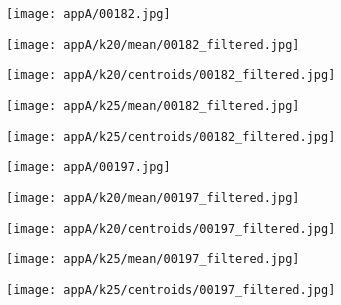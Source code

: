 \documentclass[draft,final]{vutinfth} %
\begin{document}
\begin{appendices}
\begin{figure}[h]
\centering
  \begin{subfigure}[t]{0.19\columnwidth}
    \centering
    \texttt{[image: appA/00182.jpg]}
  \end{subfigure}
  \begin{subfigure}[t]{0.19\columnwidth}
    \centering
    \texttt{[image: appA/k20/mean/00182\_filtered.jpg]}
  \end{subfigure}
  \begin{subfigure}[t]{0.19\columnwidth}
    \centering
    \texttt{[image: appA/k20/centroids/00182\_filtered.jpg]}
  \end{subfigure}
  \begin{subfigure}[t]{0.19\columnwidth}
    \centering
    \texttt{[image: appA/k25/mean/00182\_filtered.jpg]}
  \end{subfigure}
  \begin{subfigure}[t]{0.19\columnwidth}
    \centering
    \texttt{[image: appA/k25/centroids/00182\_filtered.jpg]}
  \end{subfigure}
\caption{}
\end{figure}  

\begin{figure}[h]
\centering
  \begin{subfigure}[t]{0.19\columnwidth}
    \centering
    \texttt{[image: appA/00197.jpg]}
  \end{subfigure}
  \begin{subfigure}[t]{0.19\columnwidth}
    \centering
    \texttt{[image: appA/k20/mean/00197\_filtered.jpg]}
  \end{subfigure}
  \begin{subfigure}[t]{0.19\columnwidth}
    \centering
    \texttt{[image: appA/k20/centroids/00197\_filtered.jpg]}
  \end{subfigure}
  \begin{subfigure}[t]{0.19\columnwidth}
    \centering
    \texttt{[image: appA/k25/mean/00197\_filtered.jpg]}
  \end{subfigure}
  \begin{subfigure}[t]{0.19\columnwidth}
    \centering
    \texttt{[image: appA/k25/centroids/00197\_filtered.jpg]}
  \end{subfigure}
\caption{}
\end{figure}  


\end{appendices}
\end{document}
